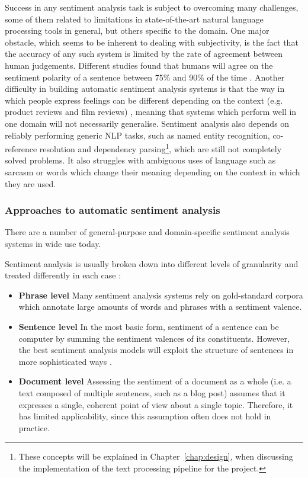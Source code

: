 \documentclass[bsc,frontabs,singlespacing,parskip, twoside]{infthesis}
\begin{document}
Success in any sentiment analysis task is subject to overcoming many challenges, some of them related to limitations in state-of-the-art natural language processing tools in general, but others specific to the domain. One major obstacle, which seems to be inherent to dealing with subjectivity, is the fact that the accuracy of any such system is limited by the rate of agreement between human judgements. Different studies found that humans will agree on the sentiment polarity of a sentence between 75\% and 90\% of the time \cite{godbole2007large, wilson2005recognizing}. Another difficulty in building automatic sentiment analysis systems is that the way in which people express feelings can be different depending on the context (e.g. product reviews and film reviews) \cite{varghesesurvey}, meaning that systems which perform well in one domain will not necessarily generalise. Sentiment analysis also depends on reliably performing generic NLP tasks, such as named entity recognition, co-reference resolution and dependency parsing\footnote{These concepts will be explained in Chapter~\ref{chap:design}, when discussing the implementation of the text processing pipeline for the project.}, which are still not completely solved problems. It also struggles with ambiguous uses of language such as sarcasm or words which change their meaning depending on the context in which they are used.

\subsubsection{Approaches to automatic sentiment analysis}

There are a number of general-purpose and domain-specific sentiment analysis systems in wide use today.

Sentiment analysis is usually broken down into different levels of granularity and treated differently in each case \cite{liu2012sentiment}:
\begin{itemize}
	\item \textbf{Phrase level} Many sentiment analysis systems rely on gold-standard corpora which annotate large amounts of words and phrases with a sentiment valence.
	\item \textbf{Sentence level} In the most basic form, sentiment of a sentence can be computer by summing the sentiment valences of its constituents. However, the best sentiment analysis models will exploit the structure of sentences in more sophisticated ways \cite{socher2013recursive}.
	\item \textbf{Document level} Assessing the sentiment of a document as a whole (i.e. a text composed of multiple sentences, such as a blog post) assumes that it expresses a single, coherent point of view about a single topic. Therefore, it has limited applicability, since this assumption often does not hold in practice.
\end{itemize}
\end{document}
